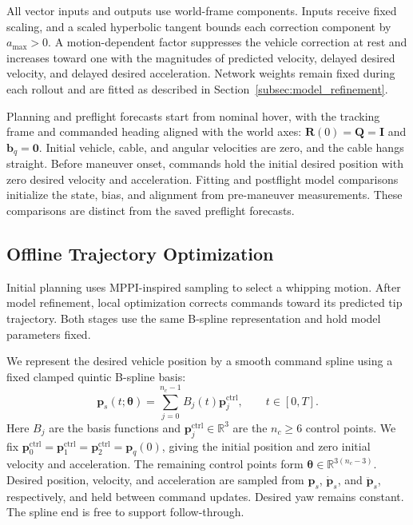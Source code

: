 \documentclass[letterpaper, 10 pt, conference]{ieeeconf}
\begin{document}
All vector inputs and outputs use world-frame components.
Inputs receive fixed scaling, and a scaled hyperbolic tangent
bounds each correction component by $a_{\max}>0$.
A motion-dependent factor suppresses the vehicle correction at
rest and increases toward one with the magnitudes of predicted
velocity, delayed desired velocity, and delayed desired acceleration.
Network weights remain fixed during each rollout and are fitted
as described in Section~\ref{subsec:model_refinement}.

Planning and preflight forecasts start from nominal hover,
with the tracking frame and commanded heading aligned with the
world axes: $\mathbf R(0)=\mathbf Q=\mathbf I$ and
$\mathbf b_q=\mathbf0$. Initial vehicle, cable, and angular
velocities are zero, and the cable hangs straight.
Before maneuver onset, commands hold the initial desired
position with zero desired velocity and acceleration.
Fitting and postflight model comparisons initialize the state,
bias, and alignment from pre-maneuver measurements. These
comparisons are distinct from the saved preflight forecasts.

\subsection{Offline Trajectory Optimization}
\label{subsec:offline_planning}

Initial planning uses MPPI-inspired sampling to select a whipping
motion. After model refinement, local optimization corrects commands
toward its predicted tip trajectory. Both stages use the same
B-spline representation and hold model parameters fixed.

We represent the desired vehicle position by a smooth command spline
using a fixed clamped quintic B-spline basis:
\begin{equation}
\mathbf p_s(t;\boldsymbol\theta)
=\sum_{j=0}^{n_c-1}B_j(t)\mathbf p_j^{\mathrm{ctrl}},
\qquad t\in[0,T].
\label{eq:spline_reference}
\end{equation}
Here $B_j$ are the basis functions and $\mathbf p_j^{\mathrm{ctrl}}\in\mathbb R^3$
are the $n_c\geq6$ control points. We fix
$\mathbf p_0^{\mathrm{ctrl}}=\mathbf p_1^{\mathrm{ctrl}}=\mathbf p_2^{\mathrm{ctrl}}=\mathbf p_q(0)$, giving the
initial position and zero initial velocity and acceleration.
The remaining control points form
$\boldsymbol\theta\in\mathbb R^{3(n_c-3)}$.
Desired position, velocity, and acceleration are sampled from
$\mathbf p_s$, $\dot{\mathbf p}_s$, and $\ddot{\mathbf p}_s$,
respectively, and held between command updates. Desired yaw
remains constant. The spline end is free to support follow-through.
\end{document}
